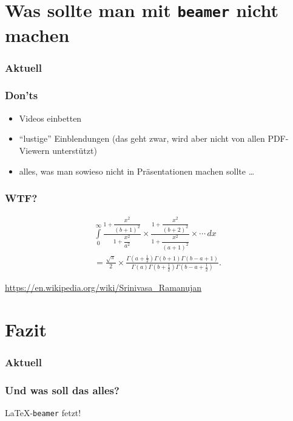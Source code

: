 \documentclass{beamer}
\begin{document}
\section{Was sollte man mit \texttt{beamer} nicht machen}

\begin{frame}
  \frametitle{Aktuell}
  \tableofcontents[currentsection]{}
\end{frame}

\begin{frame}
  \frametitle{Don'ts}

  \begin{itemize}
  \item<+-> Videos einbetten
  \item<+-> \enquote{lustige} Einblendungen (das geht zwar, wird aber nicht von
    allen PDF-Viewern unterstützt)
  \item<+-> alles, was man sowieso nicht in Präsentationen machen sollte \ldots
  \end{itemize}

\end{frame}

\begin{frame}
  \frametitle{WTF?}

  \onslide<+->

  \begin{multline*}
    \int \limits _{0}^{\infty }{\frac {1+{\dfrac {x^{2}}{(b+1)^{2}}}}{1+{\dfrac
          {x^{2}}{a^{2}}}}}\times {\frac {1+{\dfrac
          {x^{2}}{(b+2)^{2}}}}{1+{\dfrac {x^{2}}{(a+1)^{2}}}}}\times \cdots \,dx \\
    = {\frac {\sqrt {\pi }}{2}}\times {\frac {\Gamma \left(a+{\frac
            {1}{2}}\right)\Gamma (b+1)\Gamma (b-a+1)}{\Gamma (a)\Gamma
        \left(b+{\frac {1}{2}}\right)\Gamma \left(b-a+{\frac {1}{2}}\right)}}.
  \end{multline*}

  \bigskip

  {\tiny \url{https://en.wikipedia.org/wiki/Srinivasa_Ramanujan}}

\end{frame}

\section{Fazit}

\begin{frame}
  \frametitle{Aktuell}
  \tableofcontents[currentsection]{}
\end{frame}

\begin{frame}
  \frametitle{Und was soll das alles?}

  \begin{center}
    \LaTeX{}-\texttt{beamer} fetzt!
  \end{center}

\end{frame}
\end{document}
